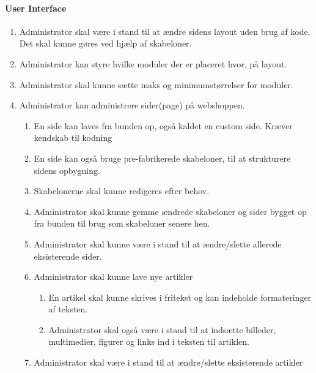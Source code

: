 \paragraph{User Interface}
\begin{enumerate}
\item Administrator skal være i stand til at ændre sidens layout uden brug af kode. Det skal kunne gøres ved hjælp af skabeloner.
\item Administrator kan styre hvilke moduler der er placeret hvor, på layout.
\item Administrator skal kunne sætte maks og minimumstørrelser for moduler.
\item Administrator kan administrere sider(page) på webshoppen.
	\begin{enumerate}
	\item En side kan laves fra bunden op, også kaldet en custom side. Kræver kendskab til kodning
    \item En side kan også bruge pre-fabrikerede skabeloner, til at strukturere sidens opbygning.
    \item Skabelonerne skal kunne redigeres efter behov.
    \item Administrator skal kunne gemme ændrede skabeloner og sider bygget op fra bunden til brug som skabeloner senere hen.
    \item Administrator skal kunne være i stand til at ændre/slette allerede eksisterende sider.
    \item Administrator skal kunne lave nye artikler
    	\begin{enumerate}
    	\item En artikel skal kunne skrives i fritekst og kan indeholde formateringer af teksten.
        \item Administrator skal også være i stand til at indsætte billeder, multimedier, figurer og links ind i teksten til artiklen.
    	\end{enumerate}
    \item Administrator skal være i stand til at ændre/slette eksisterende artikler
	\end{enumerate}
\end{enumerate}

